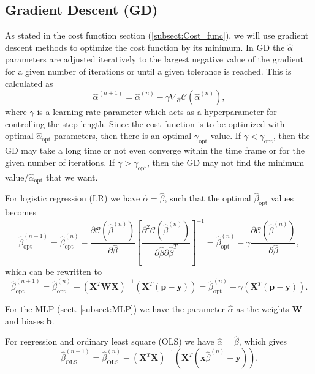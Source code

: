 \documentclass[12pt,a4paper,english]{article}
\begin{document}
\subsection{Gradient Descent (GD)}
\label{sect:GD}
As stated in the cost function section (\ref{subsect:Cost_func}), we will use gradient descent methods to optimize the cost function by its minimum. In GD the $\hat{\alpha}$ parameters are adjusted iteratively to the largest negative value of the gradient for a given number of iterations or until a given tolerance is reached. This is calculated as
\begin{equation}
\label{eq:GD_general}
\hat{\alpha}^{(n+1)}=\hat{\alpha}^{(n)}-\gamma\nabla_{\hat{\alpha}} \mathcal{C}(\hat{\alpha}^{(n)}),
\end{equation}
where $\gamma$ is a learning rate parameter which acts as a hyperparameter for controlling the step length. Since the cost function is to be optimized with optimal $\hat{\alpha}_{\text{opt}}$ parameters, then there is an optimal $\gamma_{\text{opt}}$ value. If $\gamma<\gamma_{\text{opt}}$, then the GD may take a long time or not even converge within the time frame or for the given number of iterations. If $\gamma>\gamma_{\text{opt}}$, then the GD may not find the minimum value/$\hat{\alpha}_{\text{opt}}$ that we want.

For logistic regression (LR) we have $\hat{\alpha}=\hat{\beta}$, such that the optimal $\hat{\beta}_{\text{opt}}$ values becomes
\begin{equation*}
\label{eq:GD}
\hat{\beta}_{\text{opt}}^{(n+1)}=\hat{\beta}_{\text{opt}}^{(n)}-\frac{\partial \mathcal{C}(\hat{\beta}^{(n)})}{\partial \hat{\beta}}\left[\frac{\partial^2 \mathcal{C}(\hat{\beta}^{(n)})}{\partial \hat{\beta}\partial \hat{\beta}^T}\right]^{-1}=\hat{\beta}^{(n)}_{\text{opt}}-\gamma\frac{\partial \mathcal{C}(\hat{\beta}^{(n)})}{\partial \hat{\beta}},
\end{equation*}
which can be rewritten to
\begin{equation}
\label{eq:GD_LR}
\hat{\beta}_{\text{opt}}^{(n+1)}=\hat{\beta}_{\text{opt}}^{(n)}-(\textbf{X}^T\textbf{W}\textbf{X})^{-1}(\textbf{X}^T(\textbf{p}-\textbf{y}))=\hat{\beta}_{\text{opt}}^{(n)}-\gamma(\textbf{X}^T(\textbf{p}-\textbf{y})).
\end{equation}

For the MLP (sect. \ref{subsect:MLP}) we have the parameter $\hat{\alpha}$ as the weights \textbf{W} and biases \textbf{b}.

For regression and ordinary least square (OLS) we have $\hat{\alpha}=\hat{\beta}$, which gives
\begin{equation}
\label{eq:GD_OLS}
\hat{\beta}_{\text{OLS}}^{(n+1)}=\hat{\beta}_{\text{OLS}}^{(n)}-(\textbf{X}^T\textbf{X})^{-1}(\textbf{X}^T(\textbf{x}\hat{\beta}^{(n)}-\textbf{y})).
\end{equation}
\end{document}
